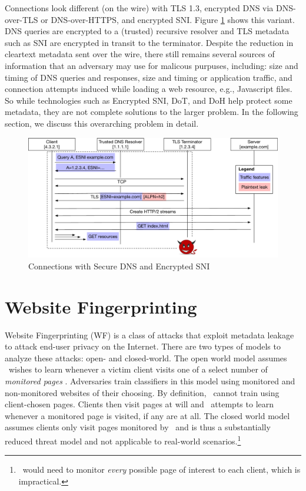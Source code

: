 \documentclass[runningheads]{llncs}
\begin{document}
Connections look different (on the wire) with TLS 1.3, encrypted DNS via DNS-over-TLS or
DNS-over-HTTPS, and encrypted SNI. Figure \ref{fig:connections-now} shows this variant.
DNS queries are encrypted to a (trusted) recursive resolver and TLS metadata such as SNI
are encrypted in transit to the terminator. Despite the reduction in cleartext metadata
sent over the wire, there still remains several sources of information that an adversary
may use for malicous purpuses, including: size and timing of DNS queries and responses,
size and timing or application traffic, and connection attempts induced while loading a
web resource, e.g., Javascript files. So while technologies such as Encrypted SNI, DoT,
and DoH help protect some metadata, they are not complete solutions to the larger problem.
In the following section, we discuss this overarching problem in detail.

\begin{figure}
\includegraphics[scale=0.35]{figures/connection_flow_now}
\caption{Connections with Secure DNS and Encrypted SNI}
\label{fig:connections-now}
\end{figure}


\section{Website Fingerprinting}
Website Fingerprinting (WF) is a class of attacks that exploit metadata leakage to attack
end-user privacy on the Internet. There are two types of models to analyze these attacks:
open- and closed-world. The open world model assumes \adv\ wishes to learn whenever a victim
client visits one of a select number of \emph{monitored pages} \cite{wang2016website}. Adversaries train
classifiers in this model using monitored and non-monitored websites of their choosing. By
definition, \adv\ cannot train using client-chosen pages. Clients then visit pages at will
and \adv\ attempts to learn whenever a monitored page is visited, if any are at all. The closed
world model assumes clients only visit pages monitored by \adv\ and is thus a substantially
reduced threat model and not applicable to real-world scenarios.\footnote{\adv\ would need to
monitor \emph{every} possible page of interest to each client, which is impractical.}
\end{document}
